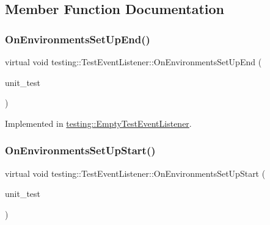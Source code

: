 \subsection{Member Function Documentation}
\mbox{\label{classtesting_1_1_test_event_listener_aaa1021d75f5dbf3f05c829c1cc520341}} 
\subsubsection{\texorpdfstring{OnEnvironmentsSetUpEnd()}{OnEnvironmentsSetUpEnd()}}
{\footnotesize\ttfamily virtual void testing\+::\+Test\+Event\+Listener\+::\+On\+Environments\+Set\+Up\+End (\begin{DoxyParamCaption}\item[{const \mbox{\hyperlink{classtesting_1_1_unit_test}{Unit\+Test}} \&}]{unit\+\_\+test }\end{DoxyParamCaption})\hspace{0.3cm}{\ttfamily [pure virtual]}}



Implemented in \mbox{\hyperlink{classtesting_1_1_empty_test_event_listener_abc481c6648d15d4242245195a06f5aa0}{testing\+::\+Empty\+Test\+Event\+Listener}}.

\mbox{\label{classtesting_1_1_test_event_listener_aa6502e534919605be45f26a6daf9a40c}} 
\subsubsection{\texorpdfstring{OnEnvironmentsSetUpStart()}{OnEnvironmentsSetUpStart()}}
{\footnotesize\ttfamily virtual void testing\+::\+Test\+Event\+Listener\+::\+On\+Environments\+Set\+Up\+Start (\begin{DoxyParamCaption}\item[{const \mbox{\hyperlink{classtesting_1_1_unit_test}{Unit\+Test}} \&}]{unit\+\_\+test }\end{DoxyParamCaption})\hspace{0.3cm}{\ttfamily [pure virtual]}}



